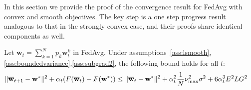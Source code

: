 In this section we provide the proof of the convergence result for FedAvg with convex and smooth objectives. The key step is a one step progress result analogous to that in the strongly convex case, and their proofs share identical components as well. 
\begin{lemma} 
Let $\overline{\mathbf{w}}_{t}=\sum_{k=1}^{N}p_{k}\mathbf{w}_{t}^{k}$ in FedAvg. Under assumptions~\ref{ass:lsmooth},\ref{ass:boundedvariance},\ref{ass:subgrad2}, the following bound holds for all $t$:
\begin{align*}
	\|{\overline{\mathbf{w}}}_{t+1}-{\mathbf{w}}^{\ast}\|^{2}+\alpha_{t}(F({\overline{\mathbf{w}}}_{t})-F({\mathbf{w}}^{\ast})) & \leq\|{\overline{\mathbf{w}}}_{t}-{\mathbf{w}}^{\ast}\|^{2}+\alpha_{t}^{2}\frac{1}{N}\nu_{\max}^{2}\sigma^{2}+6\alpha_{t}^{3}E^{2}LG^{2}
	\end{align*}
	\label{lem:cvxoner}
\end{lemma}
